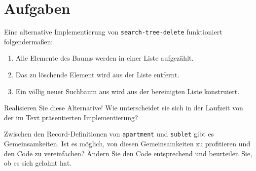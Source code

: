 \section*{Aufgaben}

\begin{aufgabe}\label{ex:naive-delete}
  Eine alternative Implementierung von \texttt{search-tree-delete}
  funktioniert folgendermaßen:
  \begin{enumerate}
  \item Alle Elemente des Baums werden in einer Liste aufgezählt.
  \item Das zu löschende Element wird aus der Liste entfernt.
  \item Ein völlig neuer Suchbaum aus wird aus der bereinigten Liste
    konstruiert.
  \end{enumerate}
  Realisieren Sie diese Alternative!  Wie unterscheidet sie sich in
  der Laufzeit von der im Text präsentierten Implementierung?
\end{aufgabe}

\begin{aufgabe}
  Zwischen den Record-Definitionen von \texttt{apartment} und
  \texttt{sublet} gibt es Gemeinsamkeiten.  Ist es möglich, von diesen
  Gemeinsamkeiten zu profitieren und den Code zu vereinfachen?
  Ändern Sie den Code entsprechend und beurteilen Sie, ob es sich
  gelohnt hat.
\end{aufgabe}


